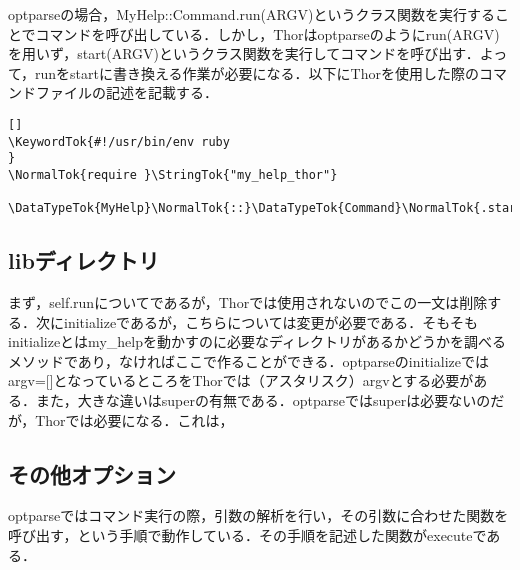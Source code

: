 \documentclass[11pt,dvipdfmx]{jsarticle}
\newcommand{\KeywordTok}[1]{\textcolor[rgb]{0.00,0.44,0.13}{\textbf{{#1}}}}
\newcommand{\DataTypeTok}[1]{\textcolor[rgb]{0.56,0.13,0.00}{{#1}}}
\newcommand{\StringTok}[1]{\textcolor[rgb]{0.25,0.44,0.63}{{#1}}}
\newcommand{\NormalTok}[1]{{#1}}
\begin{document}
optparseの場合，MyHelp::Command.run(ARGV)というクラス関数を実行することでコマンドを呼び出している．しかし，Thorはoptparseのようにrun(ARGV)を用いず，start(ARGV)というクラス関数を実行してコマンドを呼び出す．よって，runをstartに書き換える作業が必要になる．以下にThorを使用した際のコマンドファイルの記述を記載する．

\begin{screen}
{\small
\begin{verbatim}[]
\KeywordTok{#!/usr/bin/env ruby                                                                                                               }
\NormalTok{require }\StringTok{"my_help_thor"}

\DataTypeTok{MyHelp}\NormalTok{::}\DataTypeTok{Command}\NormalTok{.start(}\DataTypeTok{ARGV}\NormalTok{)}
\end{verbatim}}
\end{screen}

\subsection{libディレクトリ}\label{libux30c7ux30a3ux30ecux30afux30c8ux30ea}

まず，self.runについてであるが，Thorでは使用されないのでこの一文は削除する．次にinitializeであるが，こちらについては変更が必要である．そもそもinitializeとはmy\_helpを動かすのに必要なディレクトリがあるかどうかを調べるメソッドであり，なければここで作ることができる．optparseのinitializeではargv={[}{]}となっているところをThorでは（アスタリスク）argvとする必要がある．また，大きな違いはsuperの有無である．optparseではsuperは必要ないのだが，Thorでは必要になる．これは，

\subsection{その他オプション}\label{ux305dux306eux4ed6ux30aaux30d7ux30b7ux30e7ux30f3}

optparseではコマンド実行の際，引数の解析を行い，その引数に合わせた関数を呼び出す，という手順で動作している．その手順を記述した関数がexecuteである．
\end{document}
